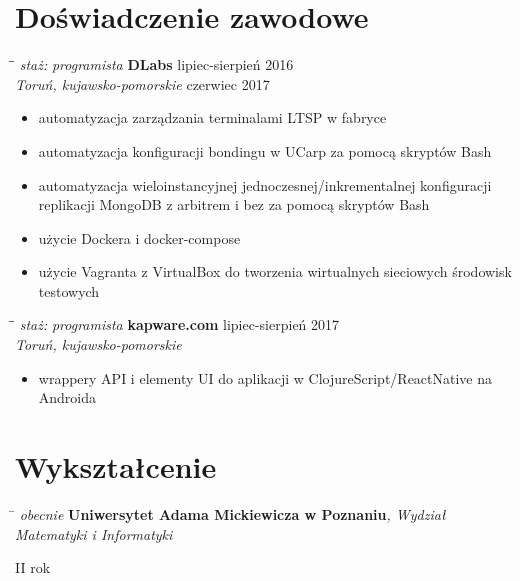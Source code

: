\documentclass[a4paper]{res}
\begin{document}
\begin{resume}
    \section{Doświadczenie zawodowe}
    \vspace{-0.05in}
    \begin{tabbing}
        \hspace{2.3in}\= \hspace{2.6in}\= \kill
        \textit{staż:} \textsl{programista}\>
        \textbf{DLabs} \>
        lipiec-sierpień 2016\\
        \> \textsl{Toruń, kujawsko-pomorskie}
        \> czerwiec 2017
    \end{tabbing}\vspace{0pt}
    \begin{itemize}
    \item automatyzacja zarządzania terminalami LTSP w fabryce
    \item automatyzacja konfiguracji bondingu w UCarp za pomocą
    skryptów Bash
    \item automatyzacja wieloinstancyjnej jednoczesnej/inkrementalnej konfiguracji replikacji MongoDB z arbitrem i bez za pomocą skryptów Bash
    \item użycie Dockera i docker-compose
    \item użycie Vagranta z VirtualBox do tworzenia wirtualnych sieciowych środowisk testowych
    \end{itemize}
    \vspace{0in}
    \begin{tabbing}
        \hspace{2.3in}\= \hspace{2.6in}\= \kill
        \textit{staż:} \textsl{programista}\>
        \textbf{kapware.com} \>
        lipiec-sierpień 2017\\
        \> \textsl{Toruń, kujawsko-pomorskie}
    \end{tabbing}
    \begin{itemize}
    \item wrappery API i elementy UI do aplikacji w ClojureScript/ReactNative na Androida
    \end{itemize}
    \section{Wykształcenie}
    \vspace{-0.05in}
    \begin{tabbing}
        \hspace{1in}\= \kill
        \textit{obecnie} \>
        \textbf{Uniwersytet Adama Mickiewicza w Poznaniu}\textit{,
        Wydział Matematyki i Informatyki}
    \end{tabbing}\vspace{-20pt}
    II rok

\end{resume}
\end{document}
